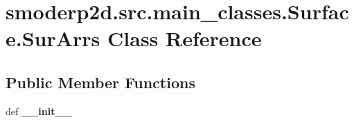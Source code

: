 \hypertarget{classsmoderp2d_1_1src_1_1main__classes_1_1Surface_1_1SurArrs}{\section{smoderp2d.\-src.\-main\-\_\-classes.\-Surface.\-Sur\-Arrs Class Reference}
\label{classsmoderp2d_1_1src_1_1main__classes_1_1Surface_1_1SurArrs}
}
\subsection*{Public Member Functions}
\begin{DoxyCompactItemize}
\item 
\hypertarget{classsmoderp2d_1_1src_1_1main__classes_1_1Surface_1_1SurArrs_a6e477bb70aa8e6c937cb486a1c2b1ce8}{def {\bfseries \-\_\-\-\_\-init\-\_\-\-\_\-}}\label{classsmoderp2d_1_1src_1_1main__classes_1_1Surface_1_1SurArrs_a6e477bb70aa8e6c937cb486a1c2b1ce8}

\end{DoxyCompactItemize}
